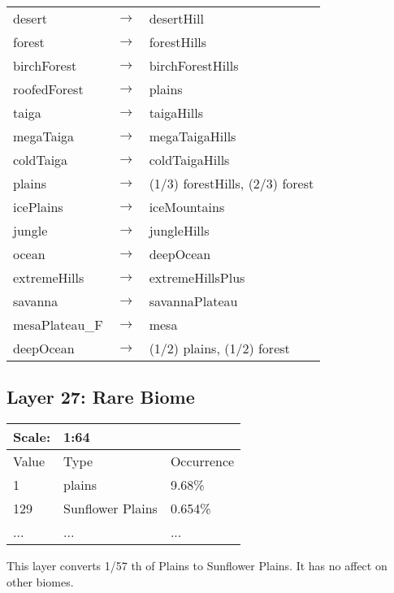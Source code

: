 \documentclass{article}
\begin{document}
	\begin{tabular}{l c l}
		desert & $\longrightarrow$ & desertHill\\
		forest & $\longrightarrow$ & forestHills\\
		birchForest & $\longrightarrow$ & birchForestHills\\
		roofedForest & $\longrightarrow$ & plains\\
		taiga & $\longrightarrow$ & taigaHills\\
		megaTaiga & $\longrightarrow$ & megaTaigaHills\\
		coldTaiga & $\longrightarrow$ & coldTaigaHills\\
		plains & $\longrightarrow$ & (1/3) forestHills, (2/3) forest\\
		icePlains & $\longrightarrow$ & iceMountains\\
		jungle & $\longrightarrow$ & jungleHills\\
		ocean & $\longrightarrow$ & deepOcean\\
		extremeHills & $\longrightarrow$ & extremeHillsPlus\\
		savanna & $\longrightarrow$ & savannaPlateau\\
		mesaPlateau\_F & $\longrightarrow$ & mesa\\
		deepOcean & $\longrightarrow$ & (1/2) plains, (1/2) forest
	\end{tabular}
	
	\subsection{Layer 27: Rare Biome}
	\begin{tabular}{|l|l|l|}\hline
		Scale: & \multicolumn{2}{|l|}{1:64} \\\hline\hline
		Value  & Type             & Occurrence \\\hline
		1      & plains           & 9.68\%\\\hline
		129    & Sunflower Plains & 0.654\%\\\hline
		...    & ...              & ...\\\hline
	\end{tabular}
	
	\medskip\noindent
	This layer converts 1/57 th of Plains to Sunflower Plains. It has no affect on other biomes.
	
\end{document}
